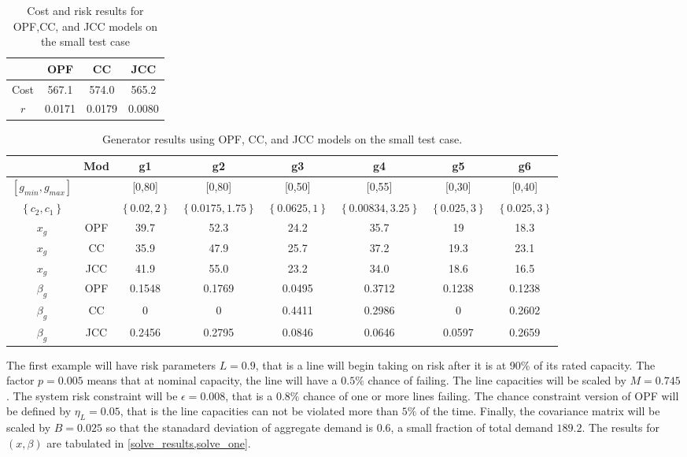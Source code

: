 \begin{table}
\centering
\begin{tabular}{ |c| c c c |}
\hline
& OPF & CC & JCC \\
\hline
\hline
Cost & 567.1 & 574.0 & 565.2\\
$r$ & 0.0171 & 0.0179 & 0.0080\\
\hline
\end{tabular}
\caption{Cost and risk results for OPF,CC, and JCC models on the small test case}\label{solve_results}
\end{table}

\begin{table}
\centering
\scriptsize
\begin{tabular}{| c| c |c c c c c c |}
\hline
 & Mod & g1 & g2 & g3 & g4 & g5 & g6 \\
\hline
\hline
$\left[ g_{min}, g_{max} \right]$& & [0,80]&[0,80] &[0,50] &[0,55] &[0,30] &[0,40]  \\
$\left\{ c_2, c_1 \right\}$ && $\left\{0.02,2\right\}$  &$\left\{0.0175,1.75\right\}$ &$\left\{0.0625,1\right\}$ &$\left\{0.00834,3.25\right\}$ &$\left\{0.025,3\right\}$ &$\left\{0.025,3\right\}$  \\
\hline
\hline
$x_g$ &OPF& 39.7  &  52.3  &  24.2  &  35.7  &  19  &  18.3   \\
$x_g$ &CC& 35.9  &  47.9  &  25.7  &  37.2  &  19.3  &  23.1    \\
$x_g$ &JCC& 41.9  &  55.0  &  23.2  &  34.0  &  18.6  &  16.5    \\
\hline
$\beta_g$ &OPF& 0.1548  &  0.1769  &  0.0495  &  0.3712  &  0.1238  &  0.1238    \\
$\beta_g$ &CC& 0  &  0  &  0.4411  &  0.2986  &  0  &  0.2602   \\
$\beta_g$ &JCC& 0.2456  &  0.2795  &  0.0846  &  0.0646  &  0.0597  &  0.2659   \\
\hline
\end{tabular}
\caption{Generator results using OPF, CC, and JCC models on the small test case.}\label{solve_one}
\end{table}

The first example will have risk parameters $L=0.9$, that is a line will begin taking on risk after it is at 90\% of its rated capacity.  The factor $p=0.005$ means that at nominal capacity, the line will have a $0.5\%$ chance of failing.  The line capacities will be scaled by $M=0.745$. The system risk constraint will be $\epsilon=0.008$, that is a $0.8\%$ chance of one or more lines failing.  The chance constraint version of OPF will be defined by $\eta_L=0.05$, that is the line capacities can not be violated more than $5\%$ of the time.  Finally, the covariance matrix will be scaled by $B=0.025$ so that the stanadard deviation of aggregate demand is $0.6$, a small fraction of total demand $189.2$.  The results for $(x,\beta)$ are tabulated in \cref{solve_results,solve_one}.



